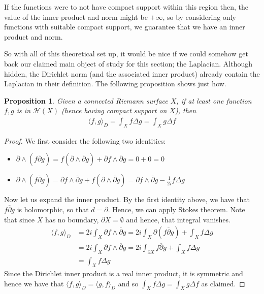 \documentclass[11pt]{report}
\newtheorem{prop}[thm]{Proposition}
\theoremstyle{definition}
\begin{document}
If the functions were to not have compact support within this region then, the value of the inner product and norm might be $+\infty$, so by considering only functions with suitable compact support, we guarantee that we have an inner product and norm. 

So with all of this theoretical set up, it would be nice if we could somehow get back our claimed main object of study for this section; the Laplacian. Although hidden, the Dirichlet norm (and the associated inner product) already contain the Laplacian in their definition. The following proposition shows just how.

\begin{prop}\label{InnerLaplacian}
  Given a connected Riemann surface $X$, if at least one function $f,g$ is in $\mathcal{H}(X)$ (hence having compact support on $X$), then 
  \begin{align*}
    \langle f, g \rangle_D = \int_X f \Delta g = \int_X g \Delta f
  \end{align*}
\end{prop}
\begin{proof}
  We first consider the following two identities:
  \begin{itemize}
    \item $\overline{\partial}\wedge(f\overline{\partial}g) = f (\overline{\partial}\wedge\overline{\partial} g) + \overline{\partial}f \wedge \overline{\partial}g = 0 + 0 = 0$
    \item $\partial\wedge(f\overline{\partial}g)=\partial f \wedge \overline{\partial}g + f(\partial\wedge\overline{\partial}g)=\partial f \wedge \overline{\partial}g - \frac{1}{2i}f\Delta g$
  \end{itemize}
  Now let us expand the inner product. By the first identity above, we have that $f\overline{\partial}g$ is holomorphic, so that $d = \partial$. Hence, we can apply Stokes theorem. Note that since $X$ has no boundary, $\partial X = \emptyset$ and hence, that integral vanishes.
  \begin{align*}
    \langle f, g \rangle_D &= 2i\int_X \partial f \wedge \overline{\partial}g = 2i\int_X \partial(f\overline{\partial}g)+\int_X f\Delta g \\
    &= 2i\int_X \partial f \wedge \overline{\partial}g = 2i\int_{\partial X} f\overline{\partial}g + \int_X f\Delta g \\
    &= \int_X f\Delta g
  \end{align*}
  Since the Dirichlet inner product is a real inner product, it is symmetric and hence we have that $\langle f, g \rangle_D = \langle g, f \rangle_D $ and so $\int_X f\Delta g = \int_X g \Delta f$ as claimed.
\end{proof}
\end{document}
